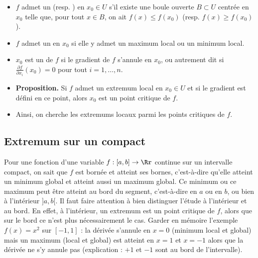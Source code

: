 \documentclass[11pt, class=report,crop=false]{standalone}
\begin{document}
\begin{itemize}
    \item $f$ admet un  (resp. ) en $x_0 \in U$ s'il existe une boule ouverte $B\subset U$ centrée en $x_0$ telle que, 
    pour tout $x \in B$, on ait $f(x) \le f(x_0)$ (resp. $f(x) \ge f(x_0)$).
        
    \item $f$ admet un  en $x_0$ si elle y admet un maximum local ou un minimum local.
    
    \item $x_0$ est un  de $f$ si le gradient de $f$ s'annule en $x_0$, ou autrement dit si $\frac{\partial f}{\partial x_i}(x_0) = 0$ pour tout $i=1,\ldots,n$. 
      
    \item  \textbf{Proposition.} Si $f$ admet un extremum local en $x_0 \in U$ et si le gradient est défini en ce point, alors $x_0$ est un point critique de $f$.

    \item Ainsi, on cherche les extremums locaux parmi les points critiques de $f$.
\end{itemize}


    
    
\subsection{Extremum sur un compact}

Pour une fonction  d'une variable $f : [a,b] \to \Rr$ continue sur un intervalle compact, on sait que $f$ est bornée et atteint ses bornes, c'est-à-dire qu'elle atteint un minimum global et atteint aussi un maximum global.  Ce minimum ou ce maximum peut être atteint au \og{}bord\fg{} du segment, c'est-à-dire en $a$ ou en $b$, ou bien à \og{}l'intérieur\fg{} $]a,b[$. 
Il faut faire attention à bien distinguer l'étude à l'intérieur et au bord. En effet, à l'intérieur, un extremum est un point critique de $f$, alors que sur le bord ce n'est plus nécessairement le cas. Garder en mémoire l'exemple $f(x) = x^2$ sur $[-1,1]$ : la dérivée s'annule en $x=0$ (minimum local et global) mais un maximum (local et global) est atteint en $x=1$ et $x=-1$ alors que la dérivée ne s'y annule pas (explication : $+1$ et $-1$ sont au bord de l'intervalle).


\end{document}
